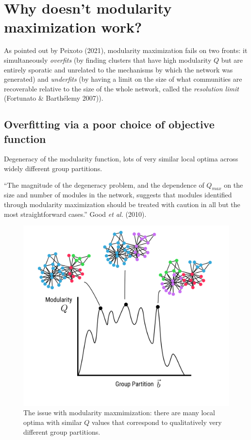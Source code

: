 \documentclass[
]{article}
\begin{document}
\hypertarget{why-doesnt-modularity-maximization-work}{%
\section{Why doesn't modularity maximization
work?}\label{why-doesnt-modularity-maximization-work}}

As pointed out by Peixoto (2021), modularity maximization fails on two
fronts: it simultaneously \emph{overfits} (by finding clusters that have
high modularity \(Q\) but are entirely sporatic and unrelated to the
mechanisms by which the network was generated) and \emph{underfits} (by
having a limit on the size of what communities are recoverable relative
to the size of the whole network, called the \emph{resolution limit}
(Fortunato \& Barthélemy 2007)).

\hypertarget{overfitting-via-a-poor-choice-of-objective-function}{%
\subsection{Overfitting via a poor choice of objective
function}\label{overfitting-via-a-poor-choice-of-objective-function}}

Degeneracy of the modularity function, lots of very similar local optima
across widely different group partitions.

``The magnitude of the degeneracy problem, and the dependence of
\(Q_{max}\) on the size and number of modules in the network, suggests
that modules identified through modularity maximization should be
treated with caution in all but the most straightforward cases.'' Good
\emph{et al.} (2010).

\begin{figure}

{\centering \includegraphics{figures/bumpy.png}

}

\caption{\label{fig-embedding}The issue with modularity maxmimization:
there are many local optima with similar \(Q\) values that correspond to
qualitatively very different group partitions.}

\end{figure}
\end{document}
